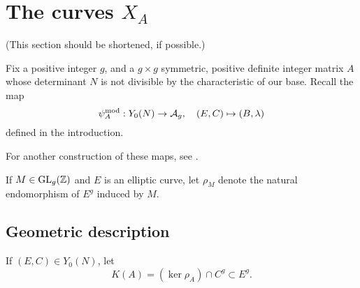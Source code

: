 \documentclass{amsart}
\begin{document}
\section{The curves $X_{A}$}
\label{sec:curves-on-Ag}

(This section should be shortened, if possible.)

Fix a positive integer $g$, and a $g \times g$ symmetric, positive definite integer matrix $A$ whose determinant $N$ is not divisible by the characteristic of our base. %
Recall the map
\[
\psi_{A}^\mathrm{mod}: Y_0(N) \to \mathcal{A}_g, \quad (E,C) \mapsto (B,\lambda)
\]
defined in the introduction.




For another construction of these maps, see \cite[p. 19 et seq.]{rains}.

\begin{definition}
If $M \in \operatorname{GL}_g(\mathbb{Z})$ and $E$ is an elliptic curve, let $\rho_M$ denote the natural endomorphism of $E^g$ induced by $M$.
\end{definition}

\subsection{Geometric description}
\label{sec:geo-desc}


If $(E, C) \in Y_0(N)$, let
$$
K(A) = (\ker \rho_A) \cap C^g  \subset E^g.
$$
\end{document}
